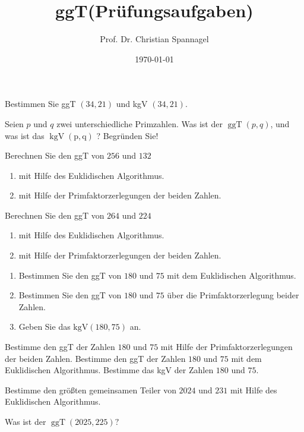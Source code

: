 \documentclass{cssheet}
\title{ggT(Prüfungsaufgaben)}
\author{Prof. Dr. Christian Spannagel}
\date{\today}
\begin{document}
\printtitle

\begin{aufgabe}[WiSe 16/17]
	Bestimmen Sie ggT $(34,21)$ und kgV $(34,21)$.
\end{aufgabe}

\begin{aufgabe}[WiSe 16/17]
	Seien $p$ und $q$ zwei unterschiedliche Primzahlen. Was ist der $\operatorname{ggT}(p, q)$, und was ist das $\operatorname{kgV}(\mathrm{p}, \mathrm{q})$ ? Begründen Sie!
\end{aufgabe}

\begin{aufgabe}[SoSe 17, HT]
	Berechnen Sie den ggT von $256$ und $132$
	\begin{enumerate}
		\item mit Hilfe des Euklidischen Algorithmus.
		\item mit Hilfe der Primfaktorzerlegungen der beiden Zahlen.
	\end{enumerate}
\end{aufgabe}

\begin{aufgabe}[SoSe 17, NT]
	Berechnen Sie den ggT von $264$ und $224$
	\begin{enumerate}
		\item mit Hilfe des Euklidischen Algorithmus.
		\item mit Hilfe der Primfaktorzerlegungen der beiden Zahlen.
	\end{enumerate}
\end{aufgabe}

\begin{aufgabe}[SoSe 22]
	\begin{enumerate}
		\item Bestimmen Sie den ggT von $180$ und $75$ mit dem Euklidischen Algorithmus.
		\item Bestimmen Sie den ggT von $180$ und $75$ über die Primfaktorzerlegung beider Zahlen.
		\item Geben Sie das $\mathrm{kgV}(180,75)$ an.
	\end{enumerate}
\end{aufgabe}

\begin{aufgabe}[SoSe 23]
	Bestimme den ggT der Zahlen $180$ und $75$ mit Hilfe der Primfaktorzerlegungen der beiden Zahlen.
	Bestimme den ggT der Zahlen $180$ und $75$ mit dem Euklidischen Algorithmus.
	Bestimme das kgV der Zahlen $180$ und $75$.
\end{aufgabe}

\begin{aufgabe}[WiSe 23/24]
	Bestimme den größten gemeinsamen Teiler von $2024$ und $231$ mit Hilfe des Euklidischen Algorithmus.
\end{aufgabe}

\begin{aufgabe}[WiSe 24/25]
	Was ist der $\operatorname{ggT}(2025,225)?$
\end{aufgabe}


\vspace*{10mm}
\printlicense

\printsocials
\end{document}
